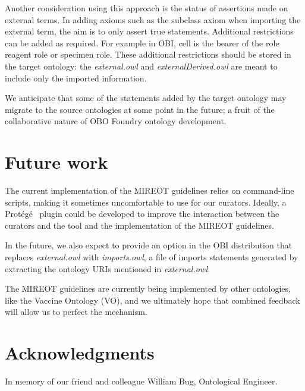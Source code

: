 \documentclass[a4paper,10pt,twocolumn]{article}
\newcommand{\protege}{Prot\'{e}g\'{e}}
\begin{document}
Another consideration using this approach is the status of assertions made on external terms.
In adding axioms such as the subclass axiom when importing the external term, the aim is to only assert true statements.
Additional restrictions can be added as required.
For example in OBI, cell is the bearer of the role reagent role or specimen role. 
These additional restrictions should be stored in the target ontology: the \emph{external.owl} and \emph{externalDerived.owl} are meant to include only the imported information.

We anticipate that some of the statements added by the target ontology may migrate to the source ontologies at some point in the future; a fruit of the collaborative nature of OBO Foundry ontology development. 


\section*{Future work}

The current implementation of the \ac{MIREOT} guidelines relies on command-line scripts, making it sometimes uncomfortable to use for our curators.
Ideally, a \protege\ \cite{RefWorks:1501} plugin could be developed to improve the interaction between the curators and the tool and the implementation of the MIREOT guidelines.

In the future, we also expect to provide an option in the OBI distribution that replaces \emph{external.owl} with \emph{imports.owl}, a file of imports statements generated by extracting the ontology URIs mentioned in \emph{external.owl}.

The MIREOT guidelines are currently being implemented by other ontologies, like the Vaccine Ontology (VO)\cite{VO}, and we ultimately hope that combined feedback will allow us to perfect the mechanism.

\section*{Acknowledgments}

In memory of our friend and colleague William Bug, Ontological Engineer. 
\end{document}
